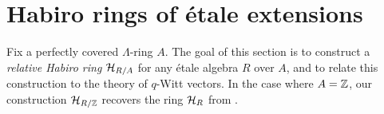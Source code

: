\documentclass[DIV=12,numbers=enddot,leqno,bibliography=totoc]{scrartcl}
\begin{document}
%		
%		
	
	
	\newpage
	
	\section{Habiro rings of étale extensions}\label{sec:HabiroRingsEtale}
	
	
	Fix a perfectly covered $\Lambda$-ring $A$. The goal of this section is to construct a \emph{relative Habiro ring} $\mathcal{H}_{R/A}$ for any étale algebra $R$ over $A$, and to relate this construction to the theory of $q$-Witt vectors. In the case where $A=\mathbb{Z}$, our construction $\mathcal{H}_{R/\mathbb{Z}}$ recovers the ring $\mathcal{H}_R$ from \cite[Definition~]{HabiroRingOfNumberField}.
	
\end{document}
